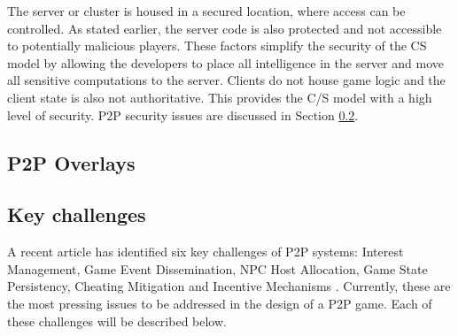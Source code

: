 \documentclass[journal,oneside,a4paper,onecolumn]{IEEEtran}
\begin{document}
The server or cluster is housed in a secured location, where access can be controlled. As stated earlier, the server code is also protected and not accessible to potentially malicious players. These factors simplify the security of the \ac{CS} model by allowing the developers to place all intelligence in the server and move all sensitive computations to the server. Clients do not house game logic and the client state is also not authoritative. This provides the C/S model with a high level of security. P2P security issues are discussed in Section \ref{key_challenges}.

\subsection{P2P Overlays}

\cite{pastry}

\subsection{Key challenges}
\label{key_challenges}

A recent article has identified six key challenges of P2P systems: Interest Management, Game Event Dissemination, NPC Host Allocation, Game State Persistency, Cheating Mitigation and Incentive Mechanisms \cite{Fan_deisgn_issues_p2p}. Currently, these are the most pressing issues to be addressed in the design of a P2P game. Each of these challenges will be described below.



\end{document}
